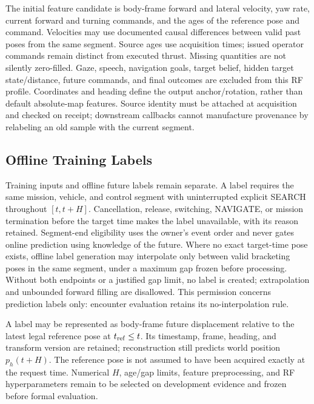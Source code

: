 \documentclass[conference]{IEEEtran}
\begin{document}
The initial feature candidate is body-frame forward and lateral velocity, yaw rate, current forward and turning commands, and the ages of the reference pose and command. Velocities may use documented causal differences between valid past poses from the same segment. Source ages use acquisition times; issued operator commands remain distinct from executed thrust. Missing quantities are not silently zero-filled. Gaze, speech, navigation goals, target belief, hidden target state/distance, future commands, and final outcomes are excluded from this RF profile. Coordinates and heading define the output anchor/rotation, rather than default absolute-map features. Source identity must be attached at acquisition and checked on receipt; downstream callbacks cannot manufacture provenance by relabeling an old sample with the current segment.

\subsection{Offline Training Labels}
Training inputs and offline future labels remain separate. A label requires the same mission, vehicle, and control segment with uninterrupted explicit SEARCH throughout $[t,t+H]$. Cancellation, release, switching, NAVIGATE, or mission termination before the target time makes the label unavailable, with its reason retained. Segment-end eligibility uses the owner's event order and never gates online prediction using knowledge of the future. Where no exact target-time pose exists, offline label generation may interpolate only between valid bracketing poses in the same segment, under a maximum gap frozen before processing. Without both endpoints or a justified gap limit, no label is created; extrapolation and unbounded forward filling are disallowed. This permission concerns prediction labels only: encounter evaluation retains its no-interpolation rule.

A label may be represented as body-frame future displacement relative to the latest legal reference pose at $t_{\rm ref}\leq t$. Its timestamp, frame, heading, and transform version are retained; reconstruction still predicts world position $p_h(t+H)$. The reference pose is not assumed to have been acquired exactly at the request time. Numerical $H$, age/gap limits, feature preprocessing, and RF hyperparameters remain to be selected on development evidence and frozen before formal evaluation.
\end{document}
